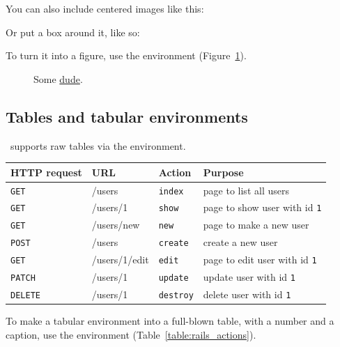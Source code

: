 \noindent You can also include centered images like this:


\noindent Or put a box around it, like so:


To turn it into a figure, use the  environment (Figure~\ref{fig:the_dude}).

\begin{figure}
\caption{Some \href{http://michaelhartl.com/}{dude}.\label{fig:the_dude}}
\end{figure}

\subsection{Tables and tabular environments}
\label{tables_and_tabular}

\PolyTeXnic\ supports raw tables via the  environment.

\begin{tabular}{llll}
\textbf{HTTP request} & \textbf{URL} & \textbf{Action} & \textbf{Purpose} \\ \hline

\texttt{GET} & /users & \texttt{index} & page to list all users \\
\texttt{GET} & /users/1 & \texttt{show} & page to show user with id \texttt{1}\\
\texttt{GET} & /users/new & \texttt{new} & page to make a new user \\
\texttt{POST} & /users & \texttt{create} & create a new user \\
\texttt{GET} & /users/1/edit & \texttt{edit} & page to edit user with id \texttt{1} \\
\texttt{PATCH} & /users/1 & \texttt{update} & update user with id \texttt{1}  \\
\texttt{DELETE} & /users/1 & \texttt{destroy} & delete user with id \texttt{1}
\end{tabular}

To make a tabular environment into a full-blown table, with a number and a caption, use the  environment (Table~\ref{table:rails_actions}).

